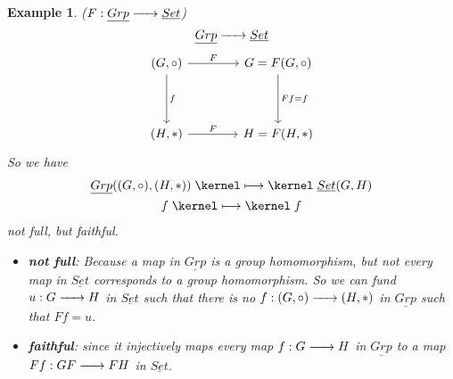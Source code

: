 \documentclass{article}
\newtheorem{example}{Example}[section]
\renewcommand{\to}{\xrightarrow{\hspace{0.5cm}}}  %
\renewcommand{\mapsto}{\mathrel{\kernel\longmapsto\kernel}}  %
\begin{document}
    \begin{example} (\(F: \underline{Grp} \to \underline{Set}\))
        \[
            \underline{Grp} \to \underline{Set}
        \]
        \[
            \begin{tikzcd}[column sep=4em, row sep=4em]
            (G, \circ)
                \arrow[r, "F"] \arrow[d, "f"]
                & G = F(G, \circ) \arrow[d, "Ff=f"] \\
                (H, *) \arrow[r, "F"]
                & H = F(H, *)
            \end{tikzcd}
        \]
        So we have
        \begin{gather*}
            \underline{Grp}((G, \circ), (H, *)) \mapsto \underline{Set}(G, H)\\
            f \mapsto f\\
        \end{gather*}
        not full, but faithful.

        \begin{itemize}
            \item \textbf{not full}: Because a map in $\underline{Grp}$ is a group homomorphism, but not every map
            in $\underline{Set}$ corresponds to a group homomorphism. So we can fund
            \(u: G \to H\) in $\underline{Set}$ such that there is no \(f: (G, \circ) \to (H, *)\) in $\underline{Grp}$ such that \(Ff = u\).
            \item \textbf{faithful}: since it injectively maps every map \(f: G \to H\) in $\underline{Grp}$ to a map \(Ff: GF \to FH\) in $\underline{Set}$.
        \end{itemize}

    \end{example}
\end{document}
